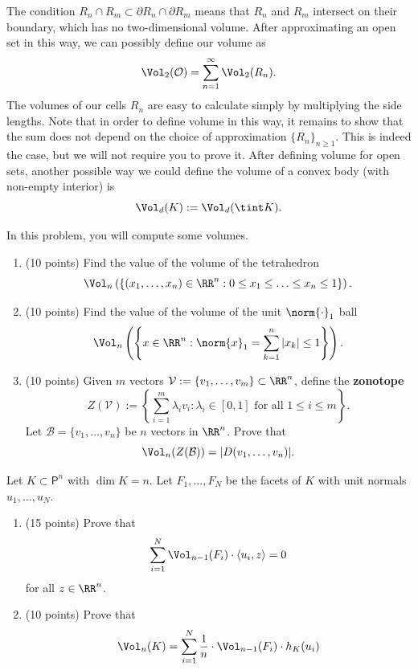 \documentclass[11pt]{article}
\begin{document}
The condition $R_n \cap R_m \subset \partial R_n \cap \partial R_m$ means that $R_n$ and $R_m$ intersect on their boundary, which has no two-dimensional volume. After approximating an open set in this way, we can possibly define our volume as 
\[
    \Vol_2(\mathcal{O}) = \sum_{n = 1}^\infty \Vol_2(R_n).    
\]
The volumes of our cells $R_n$ are easy to calculate simply by multiplying the side lengths. Note that in order to define volume in this way, it remains to show that the sum does not depend on the choice of approximation $\{R_n\}_{n \geq 1}$. This is indeed the case, but we will not require you to prove it. After defining volume for open sets, another possible way we could define the volume of a convex body (with non-empty interior) is 
\[
    \Vol_d(K) := \Vol_d(\tint K).    
\]

\begin{prob} [30 points] \label{computing-volumes}
     In this problem, you will compute some volumes. 
    \begin{enumerate}[label = (\alph*)]
        \item (10 points) Find the value of the volume of the tetrahedron
        \[
            \Vol_n \left ( \left \{ (x_1, \ldots, x_n) \in \RR^n : 0 \leq x_1 \leq \ldots \leq x_n \leq 1 \right \} \right ).    
        \]
        \item (10 points) Find the value of the volume of the unit $\norm{\cdot}_1$ ball
        \[
            \Vol_n \left ( \left \{ x \in \RR^n : \norm{x}_1 = \sum_{k = 1}^n |x_k| \leq 1 \right \} \right ).
        \]
        
        \item (10 points) Given $m$ vectors $\mathcal{V} := \{v_1, \ldots, v_m \} \subset \RR^n$, define the \textbf{zonotope}
        \[
            Z(\mathcal{V}) := \left \{ \sum_{i = 1}^m \lambda_i v_i : \lambda_i \in [0, 1] \text{ for all } 1 \leq i \leq m \right \}.
        \]
        Let $\mathcal{B} = \{v_1, \ldots, v_n\}$ be $n$ vectors in $\RR^n$. Prove that 
        \[
            \Vol_n(Z(\mathcal{B})) = | D(v_1, \ldots, v_n) |.
        \]
    \end{enumerate}
\end{prob}

\begin{prob} [25 points] \label{inductive-volume}
    Let $K \subset \mathsf{P}^n$ with $\dim K = n$. Let $F_1, \ldots, F_N$ be the facets of $K$ with unit normals $u_1, \ldots, u_N$.
    \begin{enumerate}[label = (\alph*)]
        \item (15 points) Prove that 
        \[
            \sum_{i = 1}^N \Vol_{n-1}(F_i) \cdot \langle u_i, z \rangle = 0
        \]
        for all $z \in \RR^n$. 

        \item (10 points) Prove that 
        \[
            \Vol_n(K) = \sum_{i = 1}^N \frac{1}{n} \cdot \Vol_{n-1}(F_i) \cdot h_K(u_i)
        \]
    \end{enumerate}
\end{prob}
\end{document}
